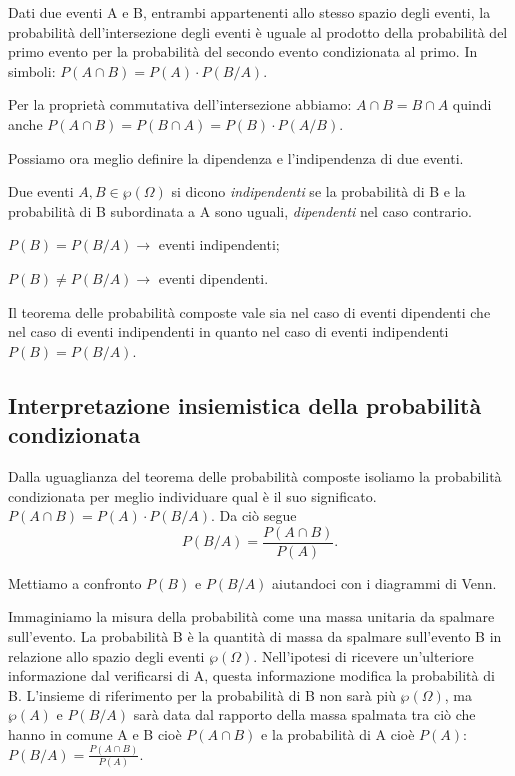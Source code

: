 \begin{teorema}
Dati due eventi A e B, entrambi appartenenti allo stesso spazio degli eventi, la probabilità dell'intersezione degli eventi è uguale al prodotto della probabilità del primo evento per la probabilità del secondo evento condizionata al primo. In simboli: $P(A\cap B)=P(A)\cdot P(B/A)$.
\end{teorema}

Per la proprietà commutativa dell'intersezione abbiamo: $A\cap B=B\cap A$ quindi anche $P(A\cap B)=P(B\cap A)=P(B)\cdot P(A/B)$.

Possiamo ora meglio definire la dipendenza e l'indipendenza di due eventi.

\begin{definizione}
Due eventi $A,B\in \wp (\Omega )$ si dicono \emph{indipendenti} se la probabilità di B e la probabilità di B subordinata a A sono uguali, \emph{dipendenti} nel caso contrario.

$P(B)=P(B/A)\to$ eventi indipendenti;

 ${P}(B)\neq P(B/A)\to$ eventi dipendenti.
\end{definizione}

\osservazione Il teorema delle probabilità composte vale sia nel caso di eventi dipendenti che nel caso di eventi indipendenti in quanto nel caso di eventi indipendenti $P(B)=P(B/A)$.

\subsection{Interpretazione insiemistica della probabilità condizionata}
Dalla uguaglianza del teorema delle probabilità composte isoliamo la probabilità condizionata per meglio individuare qual è il suo significato. $P(A\cap B)=P(A)\cdot P(B/A)$. Da ciò segue 
\[P(B/A)=\frac{P(A\cap B)}{P(A)}.\]

Mettiamo a confronto $P(B)$ e $P(B/A)$ aiutandoci con i diagrammi di Venn.
\begin{center}
 
\end{center}
Immaginiamo la misura della probabilità come una massa unitaria da spalmare sull'evento. La probabilità B è la quantità di massa da spalmare sull'evento B in relazione allo spazio degli eventi $\wp (\Omega )$. Nell'ipotesi di ricevere un'ulteriore informazione dal verificarsi di A, questa informazione modifica la probabilità di B. L'insieme di riferimento per la probabilità di B non sarà più $\wp (\Omega )$, ma $\wp (A)$ e $P(B/A)$ sarà data dal rapporto della massa spalmata tra ciò che hanno in comune A e B cioè $P(A\cap B)$ e la probabilità di A cioè $P(A)$: $P(B/A)=\frac{P(A\cap B)}{P(A)}$.

